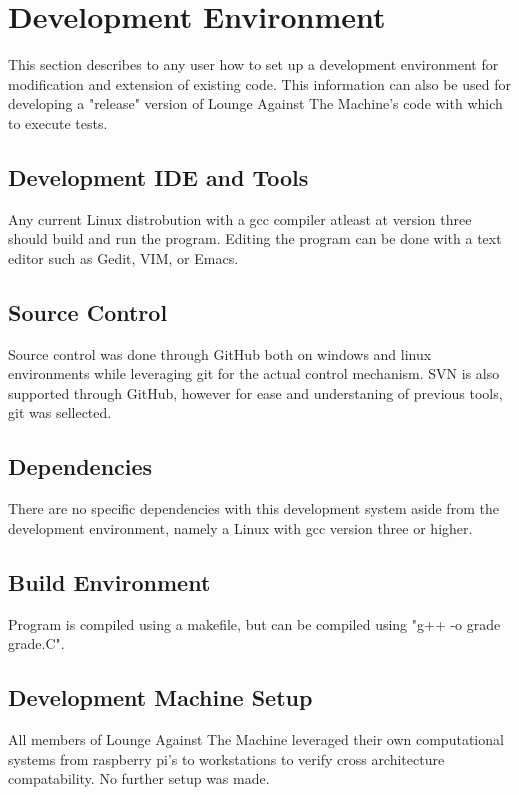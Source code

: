 \chapter{Development Environment}

This section describes to any user how to set up a development environment for modification and extension of existing code.  This information can also be used for developing a "release" version of Lounge Against The Machine's code with which to execute tests.

\section{Development IDE and Tools}
Any current Linux distrobution with a gcc compiler atleast at version three should build and run the program. Editing the program can be done with a text editor such as Gedit, VIM, or Emacs.

\section{Source  Control}
Source control was done through GitHub both on windows and linux environments while leveraging git for the actual control mechanism.  SVN is also supported through GitHub, however for ease and understaning of previous tools, git was sellected.

\section {Dependencies}
There are no specific dependencies with this development system aside from the development environment, namely a Linux with gcc version three or higher.

\section{Build  Environment}
Program is compiled using a makefile, but can be compiled using "g++ -o grade grade.C".

\section {Development Machine Setup}
All members of Lounge Against The Machine leveraged their own computational systems from raspberry pi's to workstations to verify cross architecture compatability.  No further setup was made.